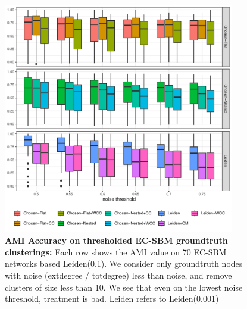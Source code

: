 \documentclass[aps,pre,superscriptaddress]{article}
\begin{document}
\begin{figure}[!htpb]
    \centering
    \includegraphics[width=0.9\textwidth]{figures/threshold_acc_leiden.1.pdf}
    \caption[]{\textbf{AMI Accuracy on thresholded EC-SBM groundtruth clusterings:} Each row shows the AMI value on 70 EC-SBM networks based Leiden(0.1). We consider only groundtruth nodes with noise (extdegree / totdegree) less than noise, and remove clusters of size less than 10. We see that even on the lowest noise threshold, treatment is bad. Leiden refers to Leiden(0.001) }
\end{figure}
\end{document}
